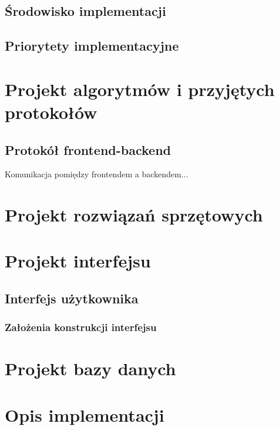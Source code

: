 \subsection{Środowisko implementacji}

\subsection{Priorytety implementacyjne}

\section{Projekt algorytmów i przyjętych protokołów}

\subsection{Protokół frontend-backend}
Komunikacja pomiędzy frontendem a backendem...

\section{Projekt rozwiązań sprzętowych}

\section{Projekt interfejsu}

\subsection{Interfejs użytkownika}

\subsubsection{Założenia konstrukcji interfejsu}

\section{Projekt bazy danych}

\section{Opis implementacji}
